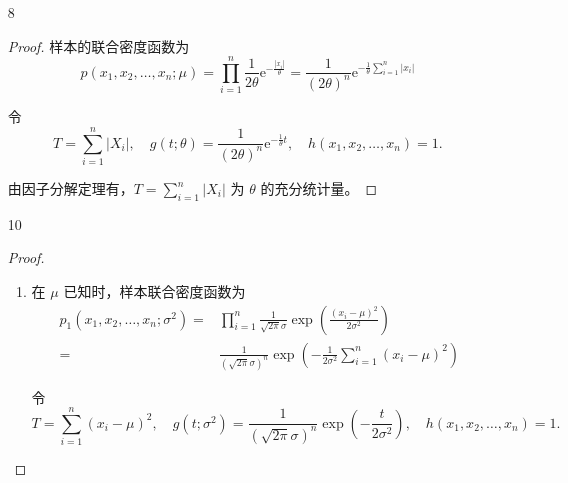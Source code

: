 \documentclass[normal,founder,mtpro2,cn]{elegantnote}
\begin{document}
\begin{enumerate}
\begin{proof}
            由因子分解定理有，$T=\sum_{i=1}^{n}x_{i}^{m}$ 为 $\theta$ 的充分统计量。
        \end{proof}
    \item[8]
        \begin{proof}
            样本的联合密度函数为
            \begin{equation*}
                p\left(x_{1},x_{2},\ldots,x_{n};\mu\right)=\prod_{i=1}^{n}\frac{1}{2\theta}\mathrm{e}^{-\frac{\left|x_{i}\right|}{\theta}}=\frac{1}{(2\theta)^{n}}\mathrm{e}^{-\frac{1}{\theta}\sum_{i=1}^{n}\left|x_{i}\right|}
            \end{equation*}

            令
            \begin{equation*}
                T=\sum_{i=1}^{n}\left|X_{i}\right|,\quad g\left(t;\theta\right)=\frac{1}{(2\theta)^{n}}\mathrm{e}^{-\frac{1}{\theta}t},\quad h\left(x_{1},x_{2},\ldots,x_{n}\right)=1.
            \end{equation*}

            由因子分解定理有，$T=\sum_{i=1}^{n}\left|X_{i}\right|$ 为 $\theta$ 的充分统计量。
        \end{proof}
    \item[10]
        \begin{proof}
            \begin{enumerate}
                \item 在 $\mu$ 已知时，样本联合密度函数为
                      \begin{equation*}
                          \begin{aligned}
                              p_{1}\left(x_{1},x_{2},\ldots,x_{n};\sigma^{2}\right)= & \prod_{i=1}^{n}\frac{1}{\sqrt{2\pi}\sigma}\exp\left(\frac{\left(x_{i}-\mu\right)^{2}}{2\sigma^{2}}\right)        \\
                              =                                                      & \frac{1}{(\sqrt{2\pi}\sigma)^{n}}\exp\left(-\frac{1}{2\sigma^{2}}\sum_{i=1}^{n}\left(x_{i}-\mu\right)^{2}\right)
                          \end{aligned}
                      \end{equation*}

                      令
                      \begin{equation*}
                          T=\sum_{i=1}^{n}\left(x_{i}-\mu\right)^{2},\quad g\left(t;\sigma^{2}\right)=\frac{1}{(\sqrt{2\pi}\sigma)^{n}}\exp\left(-\frac{t}{2\sigma^{2}}\right),\quad h\left(x_{1},x_{2},\ldots,x_{n}\right)=1.
                      \end{equation*}


\end{enumerate}
\end{proof}
\end{enumerate}
\end{document}
